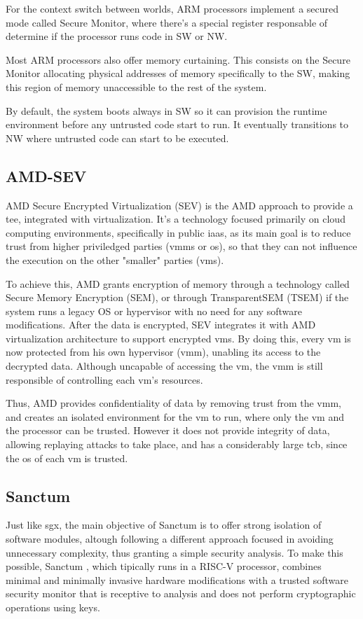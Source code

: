 For the context switch between worlds, ARM processors implement a secured mode called Secure Monitor, where there's a special register responsable of determine if the processor runs code in SW or NW. 

Most ARM processors also offer memory curtaining. This consists on the Secure Monitor allocating physical addresses of memory specifically to the SW, making this region of memory unaccessible to the rest of the system.

By default, the system boots always in SW so it can provision the runtime environment before any untrusted code start to run. It eventually transitions to NW where untrusted code can start to be executed. 

\subsection{AMD-SEV}
\label{ssec:amdsev}
AMD Secure Encrypted Virtualization (SEV) is the AMD approach to provide a \gls{tee}, integrated with virtualization. It's a technology focused primarily on cloud computing environments, specifically in public \gls{iaas}, as its main goal is to reduce trust from higher priviledged parties (\gls{vmm}s or \gls{os}), so that they can not influence the execution on the other "smaller" parties (\gls{vm}s). 

To achieve this, AMD grants encryption of memory through a technology called Secure Memory Encryption (SEM), or through TransparentSEM (TSEM) if the system runs a legacy OS or hypervisor with no need for any software modifications.
After the data is encrypted, SEV integrates it with AMD virtualization architecture to support encrypted \gls{vm}s. By doing this, every \gls{vm} is now protected from his own hypervisor (\gls{vmm}), unabling its access to the decrypted data. Although uncapable of accessing the \gls{vm}, the \gls{vmm} is still responsible of controlling each \gls{vm}'s resources. \cite{amdPaper}

Thus, AMD provides confidentiality of data by removing trust from the \gls{vmm}, and creates an isolated environment for the \gls{vm} to run, where only the \gls{vm} and the processor can be trusted. However it does not provide integrity of data, allowing replaying attacks to take place, and has a considerably large \gls{tcb}, since the \gls{os} of each \gls{vm} is trusted. \cite{amdSEVPaper}

\subsection{Sanctum}
\label{ssec:sanctum}
Just like \gls{sgx}, the main objective of Sanctum is to offer strong isolation of software modules, altough following a different approach focused in avoiding unnecessary complexity, thus granting a simple security analysis.
To make this possible, Sanctum \cite{sanctumPaper}, which tipically runs in a RISC-V processor, combines minimal and minimally invasive hardware modifications with a trusted software security monitor that is receptive to analysis and does not perform cryptographic operations using keys. 

